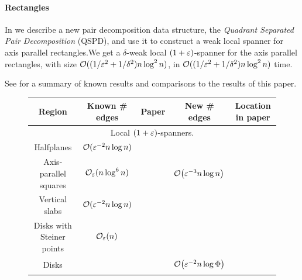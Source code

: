\documentclass[12pt]{article}%
\begin{document}
\paragraph{Rectangles}
In  we describe a new pair decomposition data structure, the \emph{Quadrant Separated Pair Decomposition} (QSPD), and use it to construct a weak local spanner for axis parallel rectangles.We get a $\delta$-weak local $(1+\varepsilon)$-spanner for the axis parallel rectangles, with size $\mathcal{O}((1/\varepsilon^2 + 1/\delta^2) n \log^2 n)$, in $\mathcal{O}((1/\varepsilon^2 + 1/\delta^2) n \log^2 n)$ time.

See  for a summary of known results and comparisons to the results of this paper.


\begin{figure}
    \centering
    
    \begin{tabular}{|c|c|c||c|c|}
    	
    	
    	\hline
		Region
		&
		Known \# edges
		&
		Paper
		&
		New \# edges
		&
		Location in paper
		\\
		\hline
		\multicolumn{5}{c}{ Local $(1+\varepsilon)$-spanners$\Bigr.$}
		\\
		\hline
		Halfplanes
		&
		$\mathcal{O}( \varepsilon^{-2} n \log n )\bigr.$
		&
		\cite{abfg-rftgs-09}
		&
		&
		\\
		\hline
		Axis-parallel squares
		&
		$\mathcal{O}_\varepsilon (n \log^6 n) \Bigr.$
		&
		\cite{ab-lgs-21}
		&
		$\Of\pth{\eps^{-3} n \log n}$
		&
		\thmref{l:s:squares}%
		\\
		\hline
		Vertical slabs
		&
		$\mathcal{O} (\varepsilon^{-2} n \log n) \Bigr.$
		&
		\cite{ab-lgs-21}
		&
		&
		\\
		\hline
		Disks with Steiner points
		&
		$\mathcal{O}_\varepsilon (n ) \Bigr.$
		&
		\cite{ab-lgs-21}
		&
		&
		\\
		\hline
		Disks
		&
		&
		&
		$\Of\pth{ \eps^{-2} n\log \spread  }\Bigr.$
		&
		\thmref{main:1}%
		\\
		
		\cline{4-5}
		

\end{tabular}
\end{figure}
\end{document}
